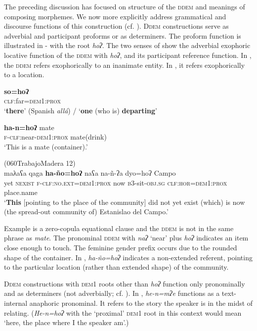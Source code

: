 \documentclass[output=paper,colorlinks,citecolor=brown]{langscibook}
\begin{document}
The preceding discussion has focused on structure of the \textsc{ddem} and meanings of composing morphemes. We now more explicitly address grammatical and discourse functions of this construction (cf. ). D\textsc{dem} constructions serve as adverbial and participant proforms or as determiners. The proform function is illustrated in - with the root \textit{hoʔ}. The two senses of  show the adverbial exophoric locative function of the \textsc{ddem} with \textit{hoʔ}, and its participant reference function. In , the \textsc{ddem} refers exophorically to an inanimate entity. In , it refers exophorically to a location.

\ea\label{ex:payne:57}
\gll  \textbf{so=hoʔ}\\
\textsc{clf}:far=\textsc{dem1:prox}\\
\glt ‘\textbf{there}’ (Spanish \textit{allá}) / ‘\textbf{one} (who is) \textbf{departing}’
\z

\ea\label{ex:payne:58}
\gll  \textbf{ha-n=hoʔ}  mate\\
 \textsc{f-clf}:near-\textsc{dem1:prox} mate(drink)\\
\glt ‘This is a mate (container).’
\z

\ea\label{ex:payne:59} (060TrabajoMadera 12)\\
\gll  maλaʕa  qaga  \textbf{ha-ño=hoʔ}    naʕa na-ñ-ʔa  dyo=hoʔ  Campo\\
yet  \textsc{nexist}  \textsc{f-clf:no.ext=dem1:prox}  now \textsc{b3}-sit-\textsc{obj.sg}  \textsc{clf:hor=dem1:prox} place.name\\
\glt ‘\textbf{This} [pointing to the place of the community] did not yet exist (which) is now (the spread-out community of) Estanislao del Campo.’ 
\z

Example  is a zero-copula equational clause and the \textsc{ddem} is not in the same phrase as \textit{mate}. The pronominal \textsc{ddem} with \textit{naʔ} ‘near’ plus \textit{hoʔ} indicates an item close enough to touch. The feminine gender prefix occurs due to the rounded shape of the container. In , \textit{ha-ño=hoʔ} indicates a non-extended referent, pointing to the particular location (rather than extended shape) of the community.

\textsc{Ddem} constructions with \textsc{dem1} roots other than \textit{hoʔ} function only pronominally and as determiners (not adverbially; cf. ). In , \textit{he-n=mʔe} functions as a text-internal anaphoric pronominal. It refers to the story the speaker is in the midst of relating. (\textit{He-n=hoʔ} with the ‘proximal’ \textsc{dem1} root in this context would mean ‘here, the place where I the speaker am’.)
\end{document}
